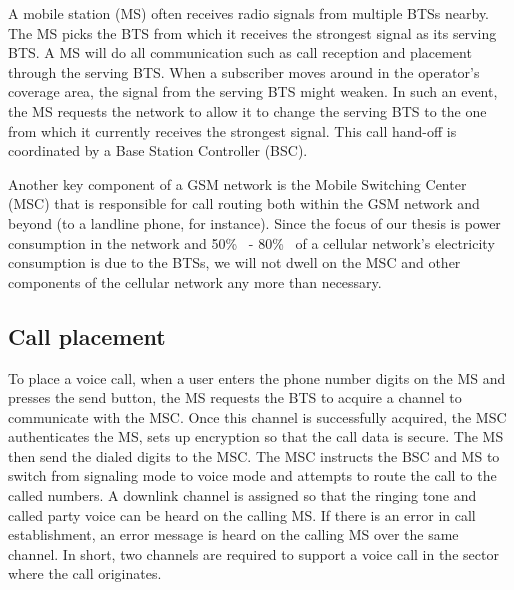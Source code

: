 A mobile station (MS) often receives radio signals from multiple BTSs nearby. The MS picks the BTS from which it receives the strongest signal as its serving BTS. A MS will do all communication such as call reception and placement through the serving BTS. When a subscriber moves around in the operator's coverage area, the signal from the serving BTS might weaken. In such an event, the MS requests the network to allow it to change the serving BTS to the one from which it currently receives the strongest signal. This call hand-off is coordinated by a Base Station Controller (BSC). 

Another key component of a GSM network is the Mobile Switching Center (MSC) that is responsible for call routing both within the GSM network and beyond (to a landline phone, for instance). Since the focus of our thesis is power consumption in the network and 50\%~\cite{Louhi:2007:BTSPower:INTELEC} - 80\%~\cite{Oh:Comm:2011} of a cellular network's electricity consumption is due to the BTSs, we will not dwell on the MSC and other components of the cellular network any more than necessary.

\subsection{Call placement} %
To place a voice call, when a user enters the phone number digits on the MS and presses the send button, the MS requests the BTS to acquire a channel to communicate with the MSC. Once this channel is successfully acquired, the MSC authenticates the MS, sets up encryption so that the call data is secure. The MS then send the dialed digits to the MSC. The MSC instructs the BSC and MS to switch from signaling mode to voice mode and attempts to route the call to the called numbers. A downlink channel is assigned so that the ringing tone and called party voice can be heard on the calling MS. If there is an error in call establishment, an error message is heard on the calling MS over the same channel. In short, two channels are required to support a voice call in the sector where the call originates.

